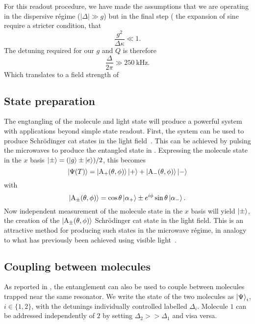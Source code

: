 For this readout procedure, we have made the assumptions that we are operating
in the dispersive r\'egime ($|\Delta| \gg g$) but in the final step
( the expansion of sine require a stricter condition,
that 
%
\begin{equation}
  \frac{g^2}{\Delta\kappa} \ll 1.
\end{equation}
%
The detuning required for our $g$ and $Q$ is therefore
%
\begin{equation}
  \frac{\Delta}{2 \pi} \gg \SI{250}{\kilo\hertz}.
\end{equation}
%
Which translates to a field strength of 

\subsection{State preparation}

The engtangling of the molecule and light state will produce a powerful system
with applications beyond simple state readout. First, the system can be used to
produce Schr\"odinger cat states in the light field~\cite{Andre2006}. This can be achieved
by pulsing the microwaves to produce the entangled state in
. Expressing the molecule state in the $x$ basis
$\ket{\pm} = (\ket{g} \pm \ket{e})/2$, this becomes
%
\begin{equation}
  \ket{\Psi(T)} = \ket{\mathrm{A}_+(\theta, \phi) }\ket{+} + \ket{\mathrm{A}_-(\theta,
  \phi)}\ket{-}
\end{equation}
%
with
%
\begin{equation}
  \ket{\mathrm{A}_\pm(\theta, \phi)} = \cos\theta\ket{\alpha_+} \pm
  e^{i\phi}\sin\theta\ket{\alpha_-}.
\end{equation}
%
Now independent measurement of the molecule state in the $x$ basis will yield
$\ket{\pm}$,  the creation of the $\ket{\mathrm{A}_\pm(\theta,
\phi)}$ Schr\"odinger cat state in the light field. This is an attractive
method for producing such states in the microwave r\'egime, in analogy to what
has previously been achieved using visible light~\cite{}.

\subsection{Coupling between molecules}

As reported in , the entanglement can also be used to
couple between molecules trapped near the same resonator. We write the state of
the two molecules as $\ket{\Psi}_i$, $i\in\{1,2\}$, with the detunings
individually controlled labelled $\Delta_i$. Molecule $1$ can be addressed
independently of $2$ by setting $\Delta_2 >> \Delta_1$ and visa versa. 

